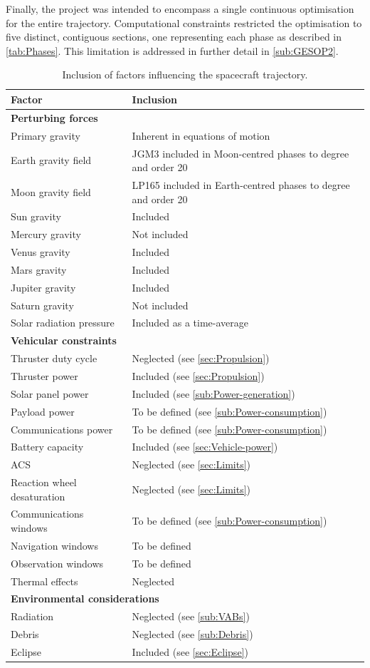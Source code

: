 Finally, the project was intended to encompass a single continuous optimisation for the entire trajectory. Computational constraints restricted the optimisation to five distinct, contiguous sections, one representing each phase as described in \autoref{tab:Phases}. This limitation is addressed in further detail in \autoref{sub:GESOP2}. 

\begin{table}
\centering
\caption{Inclusion of factors influencing the spacecraft trajectory.} \label{tab:Scope-limitations}
\begin{tabular}{p{} p{}} \toprule
Factor & Inclusion \tabularnewline\midrule
\textbf{Perturbing forces} \tabularnewline
Primary gravity & Inherent in equations of motion \tabularnewline
Earth gravity field & JGM3 included in Moon-centred phases to degree and order 20\tabularnewline
Moon gravity field & LP165 included in Earth-centred phases to degree and order 20\tabularnewline
Sun gravity & Included \tabularnewline
Mercury gravity & Not included \tabularnewline
Venus gravity & Included \tabularnewline
Mars gravity & Included \tabularnewline
Jupiter gravity & Included \tabularnewline
Saturn gravity & Not included \tabularnewline
Solar radiation pressure & Included as a time-average \tabularnewline
\textbf{Vehicular constraints} \tabularnewline
Thruster duty cycle & Neglected (see \autoref{sec:Propulsion}) \tabularnewline
Thruster power & Included (see \autoref{sec:Propulsion}) \tabularnewline
Solar panel power & Included (see \autoref{sub:Power-generation}) \tabularnewline
Payload power & To be defined (see \autoref{sub:Power-consumption}) \tabularnewline
Communications power & To be defined (see \autoref{sub:Power-consumption}) \tabularnewline
Battery capacity & Included (see \autoref{sec:Vehicle-power}) \tabularnewline
ACS & Neglected (see \autoref{sec:Limits}) \tabularnewline
Reaction wheel desaturation & Neglected (see \autoref{sec:Limits})\tabularnewline
Communications windows & To be defined (see \autoref{sub:Power-consumption}) \tabularnewline
Navigation windows & To be defined \tabularnewline
Observation windows & To be defined \tabularnewline
Thermal effects & Neglected \tabularnewline\midrule
\multicolumn{2}{l}{\textbf{Environmental considerations}} \tabularnewline
Radiation & Neglected (see \autoref{sub:VABs}) \tabularnewline
Debris & Neglected (see \autoref{sub:Debris}) \tabularnewline
Eclipse & Included (see \autoref{sec:Eclipse}) \tabularnewline
\bottomrule
\end{tabular}
\end{table}


